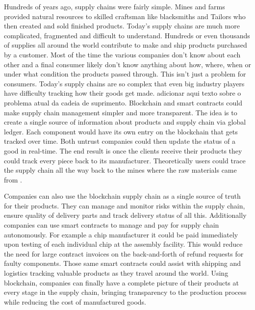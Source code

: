 
\acresetall 

Hundreds of years ago, supply chains were fairly simple. Mines and farms provided natural resources to skilled craftsman like blacksmiths and Tailors who then created and sold finished products. Today's supply chains are much more complicated, fragmented and difficult to understand. Hundreds or even thousands of supplies all around the world contribute to make and ship products purchased by a customer. Most of the time the various companies don't know about each other and a final consumer likely don't know anything about how, where, when or under what condition the products passed through. This isn't just a problem for consumers. Today's supply chains are so complex that even big industry players have difficulty tracking how their goods get made.
{\color{red}adicionar aqui texto sobre o problema atual da cadeia de suprimento.}
Blockchain and smart contracts could make supply chain management simpler and more transparent. The idea is to create a single source of information about products and supply chain via global ledger. Each component would have its own entry on the blockchain that gets tracked over time. Both untrust companies could then update the status of a good in real-time. The end result is once the clients receive their products they could track every piece back to its manufacturer. Theoretically users could trace the supply chain all the way back to the mines where the raw materials came from \cite{greve2018blockchain}.

Companies can also use the blockchain supply chain as a single source of truth for their products. They can manage and monitor risks within the supply chain, ensure quality of delivery parts and track delivery status of all this. Additionally companies can use smart contracts to manage and pay for supply chain autonomously. For example a chip manufacturer it could be paid immediately upon testing of each individual chip at the assembly facility. This would reduce the need for large contract invoices on the back-and-forth of refund requests for faulty components. Those same smart contracts could assist with shipping and logistics tracking valuable products as they travel around the world. Using blockchain, companies can finally have a complete picture of their products at every stage in the supply chain, bringing transparency to the production process while reducing the cost of manufactured goods.